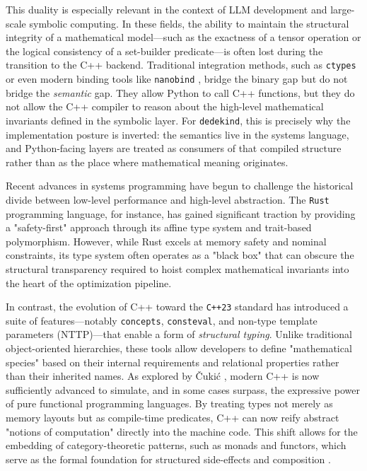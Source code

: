 \documentclass[11pt, a4paper]{report}
\begin{document}
This duality is especially relevant in the context of LLM development and large-scale symbolic computing.
In these fields, the ability to maintain the structural integrity of a mathematical model—such as the exactness of a tensor operation or the logical consistency of a set-builder predicate—is often lost during the transition to the C++ backend.
Traditional integration methods, such as \texttt{ctypes} or even modern binding tools like \texttt{nanobind} \cite{jakob2022nanobind}, bridge the binary gap but do not bridge the \emph{semantic} gap.
They allow Python to call C++ functions, but they do not allow the C++ compiler to reason about the high-level mathematical invariants defined in the symbolic layer. For \texttt{dedekind}, this is precisely why the implementation posture is inverted: the semantics live in the systems language, and Python-facing layers are treated as consumers of that compiled structure rather than as the place where mathematical meaning originates.

Recent advances in systems programming have begun to challenge the historical divide between low-level performance and high-level abstraction.
The \texttt{Rust} programming language, for instance, has gained significant traction by providing a "safety-first" approach through its affine type system and trait-based polymorphism.
However, while Rust excels at memory safety and nominal constraints, its type system often operates as a "black box" that can obscure the structural transparency required to hoist complex mathematical invariants into the heart of the optimization pipeline.

In contrast, the evolution of C++ toward the \texttt{C++23} standard  \cite{cpp23standard} has introduced a suite of features—notably \texttt{concepts}, \texttt{consteval}, and non-type template parameters (NTTP)—that enable a form of \emph{structural typing}.
Unlike traditional object-oriented hierarchies, these tools allow developers to define "mathematical species" based on their internal requirements and relational properties rather than their inherited names.
As explored by Čukić \cite{cukic2018functional}, modern C++ is now sufficiently advanced to simulate, and in some cases surpass, the expressive power of pure functional programming languages.
By treating types not merely as memory layouts but as compile-time predicates, C++ can now reify abstract "notions of computation" directly into the machine code.
This shift allows for the embedding of category-theoretic patterns, such as monads and functors, which serve as the formal foundation for structured side-effects and composition \cite{moggi1991notions, awodey2004structuralism}.
\end{document}
